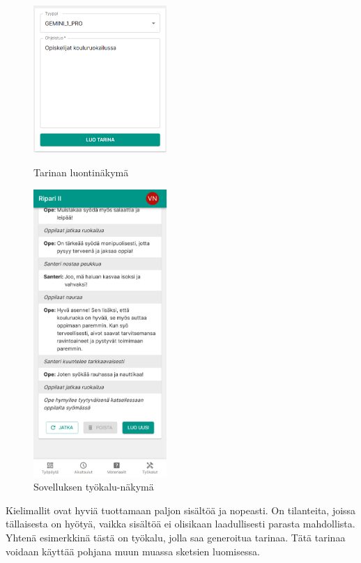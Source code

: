 \begin{figure}
    \centering
    \includegraphics[width=0.45\textwidth]{figures/isosapp-tyokalut-tarinan-generointi-1.png}
    \caption{Tarinan luontinäkymä}
    \label{fig:isosapp-tyokalut-tarinan-generointi-1}

    \qquad

    \includegraphics[width=0.45\textwidth]{figures/isosapp-tyokalut-tarinan-generointi-2.png}
    \caption{Sovelluksen työkalu-näkymä}
    \label{fig:isosapp-tyokalut-tarinan-generointi-2}
\end{figure}

Kielimallit ovat hyviä tuottamaan paljon sisältöä ja nopeasti. On tilanteita,
joissa tällaisesta on hyötyä, vaikka sisältöä ei olisikaan laadullisesti
parasta mahdollista. Yhtenä esimerkkinä tästä on työkalu, jolla saa generoitua
tarinaa. Tätä tarinaa voidaan käyttää pohjana muun muassa sketsien luomisessa.

